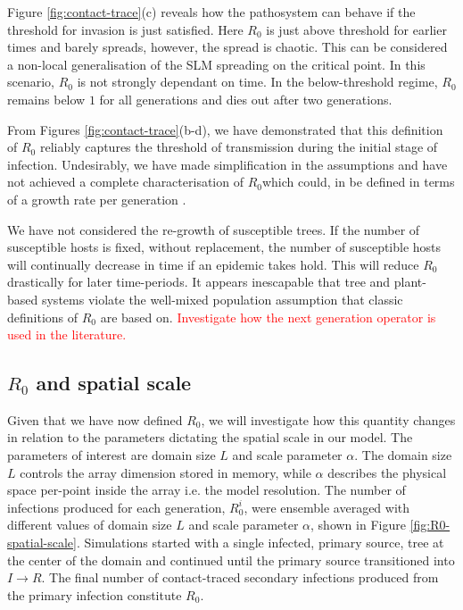 Figure \ref{fig:contact-trace}(c) reveals how the pathosystem can behave if the threshold for %
invasion is just satisfied. %
Here $R_0$ is just above threshold for earlier times and barely spreads, however, the spread is chaotic. %
This can be considered a non-local generalisation of the SLM spreading on the critical point. %
In this scenario, $R_0$ is not strongly dependant on time. %
In the below-threshold regime, $R_0$ remains below $1$ for all generations and dies out after %
two generations. %

From Figures \ref{fig:contact-trace}(b-d), we have demonstrated that this definition of $R_0$ %
reliably captures the threshold of transmission during the initial stage of infection. %
Undesirably, we have made simplification in the assumptions and have not achieved a complete %
characterisation of $R_0$\textemdash which could, in be defined in terms of a growth %
rate per generation \cite{R0-construct}. %

We have not considered the re-growth of susceptible trees. %
If the number of susceptible hosts is fixed, without replacement, the number of susceptible hosts %
will continually decrease in time if an epidemic takes hold. %
This will reduce $R_0$ drastically for later time-periods. %
It appears inescapable that tree and plant-based systems violate the well-mixed population %
assumption that classic definitions of $R_0$ are based on. %
\textcolor{red}{Investigate how the next generation operator is used in the literature.}\\


\subsection{$R_0$ and spatial scale}

Given that we have now defined $R_0$, we will investigate how this quantity changes in relation %
to the parameters dictating the spatial scale in our model. %
The parameters of interest are domain size $L$ and scale parameter $\alpha$. %
The domain size $L$ controls the array dimension stored in  memory, while $\alpha$ %
describes the physical space per-point inside the array i.e. the model resolution. %
The number of infections produced for each generation, $R_0^i$, were ensemble averaged with %
different values of domain size $L$ and scale parameter $\alpha$, %
shown in Figure \ref{fig:R0-spatial-scale}. Simulations started with a single infected, %
primary source, tree at the center of the domain and continued until the primary source %
transitioned into $I\rightarrow R$. %
The final number of contact-traced secondary infections produced from the primary infection %
constitute $R_0$.\\


